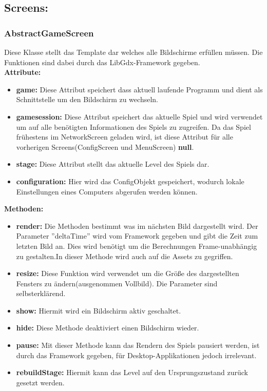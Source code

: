 \documentclass[fontsize=12pt,paper=a4,twoside]{scrartcl}
\begin{document}
\subsection{Screens:}
\subsubsection{AbstractGameScreen}
Diese Klasse stellt das Template dar welches alle Bildschirme erfüllen müssen. Die Funktionen sind dabei durch das LibGdx-Framework gegeben.\\

\textbf{Attribute:}\\
\begin{itemize}
	\item \textbf{game:} Diese Attribut speichert dass aktuell laufende Programm und dient als Schnittstelle um den Bildschirm zu wechseln.
	\item \textbf{gamesession:} Diese Attribut speichert das aktuelle Spiel und wird verwendet um auf alle benötigten Informationen des Spiels zu zugreifen. Da das Spiel frühestens im NetworkScreen geladen wird, ist diese Attribut für alle vorherigen Screens(ConfigScreen und MenuScreen) \textbf{null}.
	\item \textbf{stage:} Diese Attribut stellt das aktuelle Level des Spiels dar.
	\item \textbf{configuration:} Hier wird das ConfigObjekt gespeichert, wodurch lokale Einstellungen eines Computers abgerufen werden können.
\end{itemize}

\textbf{Methoden:}
\begin{itemize}
	\item \textbf{render:} Die Methoden bestimmt was im nächsten Bild dargestellt wird. Der Parameter ''deltaTime'' wird vom Framework gegeben und gibt die Zeit zum letzten Bild an. Dies wird benötigt um die Berechnungen Frame-unabhängig zu gestalten.In dieser Methode wird auch auf die Assets zu gegriffen.
	\item \textbf{resize:} Diese Funktion wird verwendet um die Größe des dargestellten Fensters zu ändern(ausgenommen Vollbild). Die Parameter sind selbsterklärend.
	\item \textbf{show:} Hiermit wird ein Bildschirm aktiv geschaltet.
	\item \textbf{hide:} Diese Methode deaktiviert einen Bildschirm wieder.
	\item \textbf{pause:} Mit dieser Methode kann das Rendern des Spiels pausiert werden, ist durch das Framework gegeben, für Desktop-Applikationen jedoch irrelevant.
	\item \textbf{rebuildStage:} Hiermit kann das Level auf den Ursprungszustand zurück gesetzt werden.
\end{itemize}
\end{document}
